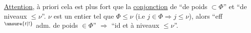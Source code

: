 
\uline{Attention}, à priori cela est plus fort que la \uline{conjonction} de ``de poids $\subset\Phi$'' et ``de niveaux $\leq\nu$''.    $\nu$ est  un entier tel que $\Phi\leq\nu$ (i.e $j\in\Phi\Rightarrow j\leq\nu$),  alors ``eff$^{\unsure{t|!}}$ adm. de poids $\in\Phi$'' $\Rightarrow$ ``id et à niveaux $\leq\nu$''.
